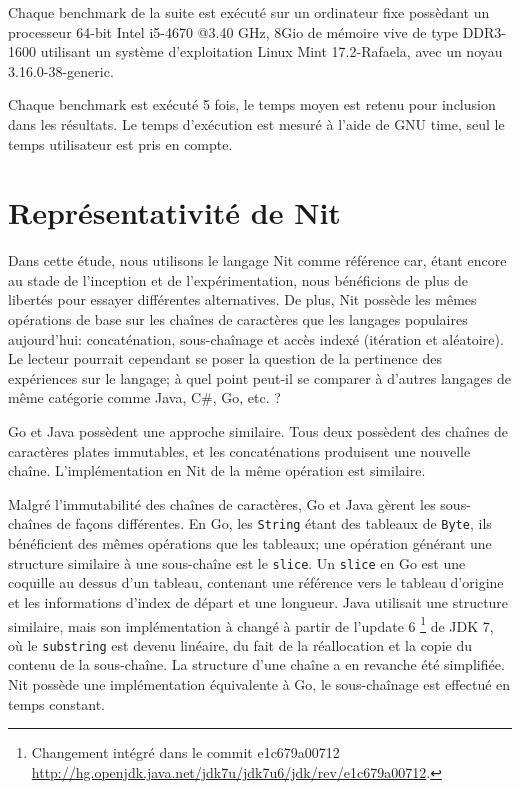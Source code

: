 Chaque benchmark de la suite est exécuté sur un ordinateur fixe possèdant un processeur
64-bit Intel i5-4670 @3.40 GHz, 8Gio de mémoire vive de type DDR3-1600 utilisant un système
d'exploitation Linux Mint 17.2-Rafaela, avec un noyau 3.16.0-38-generic.

Chaque benchmark est exécuté 5 fois, le temps moyen est retenu pour inclusion
dans les résultats.
Le temps d'exécution est mesuré à l'aide de GNU time, seul le temps utilisateur est pris
en compte.

\section{Représentativité de Nit}

Dans cette étude, nous utilisons le langage Nit comme référence
car, étant encore au stade de l'inception et de l'expérimentation,
nous bénéficions de plus de libertés pour essayer différentes alternatives.
De plus, Nit possède les mêmes opérations de base sur les chaînes de
caractères que les langages populaires aujourd'hui: concaténation, sous-chaînage et
accès indexé (itération et aléatoire).
Le lecteur pourrait cependant se poser la question de la pertinence des
expériences sur le langage; à quel point peut-il se comparer à d'autres
langages de même catégorie comme Java, C\#, Go, etc. ?

Go et Java possèdent une approche similaire.
Tous deux possèdent des chaînes de caractères plates immutables,
et les concaténations produisent une nouvelle chaîne.
L'implémentation en Nit de la même opération est similaire.

Malgré l'immutabilité des chaînes de caractères, Go et Java gèrent les
sous-chaînes de façons différentes.
En Go, les \texttt{String} étant des tableaux de \texttt{Byte}, ils bénéficient des mêmes
opérations que les tableaux; une opération générant une structure
similaire à une sous-chaîne est le \texttt{slice}. Un \texttt{slice} en Go est une coquille au
dessus d'un tableau, contenant une référence vers le tableau d'origine
et les informations d'index de départ et une longueur.
Java utilisait une structure similaire, mais son implémentation à changé
à partir de l'update 6 \footnote{Changement intégré dans le commit e1c679a00712
\url{http://hg.openjdk.java.net/jdk7u/jdk7u6/jdk/rev/e1c679a00712}.} de JDK 7, où le
\texttt{substring} est devenu linéaire, du fait de la réallocation et la
copie du contenu de la sous-chaîne.
La structure d'une chaîne a en revanche été simplifiée.
Nit possède une implémentation équivalente à Go, le sous-chaînage est
effectué en temps constant.

